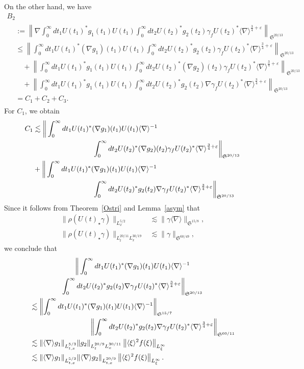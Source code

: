 \documentclass[10pt,a4paper]{amsart}
\providecommand{\No}[1]{\left\| #1 \right\|}
\newcommand{\FS}{\mathfrak{S}}
\newcommand{\ga}{\gamma}
\newcommand{\ep}{\varepsilon}
\newcommand{\rh}{\rho}
\renewcommand{\No}[1]{\left\| #1 \right\|}
\newcommand{\I}{\infty}
\newcommand{\sd}{\langle \nabla \rangle}
\newcommand{\sdi}{\sd^{-1}}
\newcommand{\lxr}{\langle \xi \rangle}
\newcommand{\tx}{{t,x}}
\newcommand{\st}{\star}
\newcommand{\fh}{\frac{3}{4}}
\newcommand{\na}{\nabla}
\newcommand{\ls}{\lesssim}
\begin{document}
On the other hand, we have
\begin{multline}
B_2\\
\begin{aligned}
&:= \No{\na \int_0^\I dt_1 U(t_1)^* g_1(t_1) U(t_1) \int_0^\I dt_2 U(t_2)^* g_2(t_2)\ga_f U(t_2)^* \sd^{\fh+\ep} }_{\FS^{20/13}} \\
&\le \No{\int_0^\I dt_1 U(t_1)^* (\na g_1)(t_1) U(t_1) \int_0^\I dt_2 U(t_2)^* g_2(t_2)\ga_f U(t_2)^* \sd^{\fh+\ep} }_{\FS^{20/13}} \\
&\quad + \No{\int_0^\I dt_1 U(t_1)^* g_1(t_1) U(t_1) \int_0^\I dt_2 U(t_2)^* (\na g_2)(t_2)\ga_f U(t_2)^* \sd^{\fh+\ep} }_{\FS^{20/13}} \\
&\quad + \No{\int_0^\I dt_1 U(t_1)^* g_1(t_1) U(t_1) \int_0^\I dt_2 U(t_2)^* g_2(t_2) \na \ga_f U(t_2)^* \sd^{\fh+\ep} }_{\FS^{20/13}} \\
&= C_1 + C_2 + C_3.
\end{aligned}
\end{multline}
For $C_1$, we obtain
\begin{equation}
\begin{split}
C_1 &\ls \bigg\|\int_0^\I dt_1 U(t_1)^* (\na g_1)(t_1) U(t_1) \sdi\\
&\mkern150mu\int_0^\I dt_2 U(t_2)^* (\na g_2)(t_2)\ga_f U(t_2)^* \sd^{\fh+\ep} \bigg\|_{\FS^{20/13}} \\
&+ \bigg\|\int_0^\I dt_1 U(t_1)^* (\na g_1)(t_1) U(t_1) \sdi \\
&\mkern150mu\int_0^\I dt_2 U(t_2)^* g_2(t_2)\na \ga_f U(t_2)^* \sd^{\fh+\ep}\bigg\|_{\FS^{20/13}}
\end{split}
\end{equation}
Since it follows from Theorem~\ref{Ostri} and Lemma~\ref{asym} that
\begin{align}
\|\rh(U(t)_\st \ga)\|_{L^{5/2}_x} &\ls \|\ga \sd \|_{\FS^{15/8}}, \\
\|\rh(U(t)_\st \ga)\|_{L^{20/11}_t L^{30/19}_x} &\ls \|\ga \|_{\FS^{60/49}},
\end{align}
we conclude that
\begin{multline}
\bigg\|\int_0^\I dt_1 U(t_1)^* (\na g_1)(t_1) U(t_1) \sdi \\
\int_0^\I dt_2 U(t_2)^* g_2(t_2) \na \ga_f U(t_2)^* \sd^{\fh+\ep} \bigg\|_{\FS^{20/13}} \\
\begin{aligned}
&\ls \No{\int_0^\I dt_1 U(t_1)^* (\na g_1)(t_1) U(t_1) \sdi}_{\FS^{15/7}}\\
&\mkern150mu\No{\int_0^\I dt_2 U(t_2)^* g_2(t_2) \na \ga_f U(t_2)^* \sd^{\fh+\ep} }_{\FS^{60/11}} \\
&\ls \|\sd g_1\|_{L^{5/3}_\tx} \|g_2\|_{L^{20/9}_t L^{30/11}_x} \left\|\lxr^2 f(\xi)\right\|_{L^\I_\xi}\\
&\ls \|\sd g_1\|_{L^{5/3}_\tx} \|\sd g_2\|_{L^{20/9}_\tx} \left\|\lxr^2 f(\xi)\right\|_{L^\I_\xi}.
\end{aligned}
\end{multline}
\end{document}
